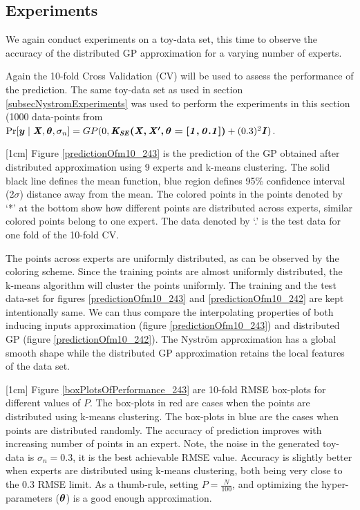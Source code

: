 \subsection{Experiments}\label{subSecDistributedExperiments}
We again conduct experiments on a toy-data set, this time to observe the accuracy of the distributed GP approximation for a varying number of experts. 

Again the 10-fold Cross Validation (CV) will be used to assess the performance of the prediction. The same toy-data set as used in section \ref{subsecNystromExperiments} was used to perform the experiments in this section (1000 data-points from $\Pr[\boldsymbol{y} \mid \bm{\mathit{X}}, \boldsymbol{\theta}, \sigma_{n}] = GP(0, \bm{\mathit{K_{SE}(X, X', \theta = [1, 0.1])}} + (0.3)^{2}\bm{\mathit{I}})$.

[1cm]
Figure \ref{predictionOfm10_243} is the prediction of the GP obtained after distributed approximation using 9 experts and k-means clustering. The solid black line defines the mean function, blue region defines 95\% confidence interval (2$\sigma$) distance away from the mean. The colored points in the points denoted by `*' at the bottom show how different points are distributed across experts, similar colored points belong to one expert. The data denoted by `.' is the test data for one fold of the 10-fold CV. 

The points across experts are uniformly distributed, as can be observed by the coloring scheme. Since the training points are almost uniformly distributed, the k-means algorithm will cluster the points uniformly. The training and the test data-set for figures \ref{predictionOfm10_243} and \ref{predictionOfm10_242} are kept intentionally same. We can thus compare the interpolating properties of both inducing inputs approximation (figure \ref{predictionOfm10_243}) and distributed GP (figure \ref{predictionOfm10_242}). The Nystr\"{o}m approximation has a global smooth shape while the distributed GP approximation retains the local features of the data set. 

[1cm]
Figure \ref{boxPlotsOfPerformance_243} are 10-fold RMSE box-plots for different values of $P$. The box-plots in red are cases when the points are distributed using k-means clustering. The box-plots in blue are the cases when points are distributed randomly. The accuracy of prediction improves with increasing number of points in an expert. Note, the noise in the generated toy-data is $\sigma_{n}=0.3$, it is the best achievable RMSE value. Accuracy is slightly better when experts are distributed using k-means clustering, both being very close to the $0.3$ RMSE limit. As a thumb-rule, setting $P = \frac{N}{100}$, and optimizing the hyper-parameters ($\boldsymbol{\theta}$) is a good enough approximation. 


